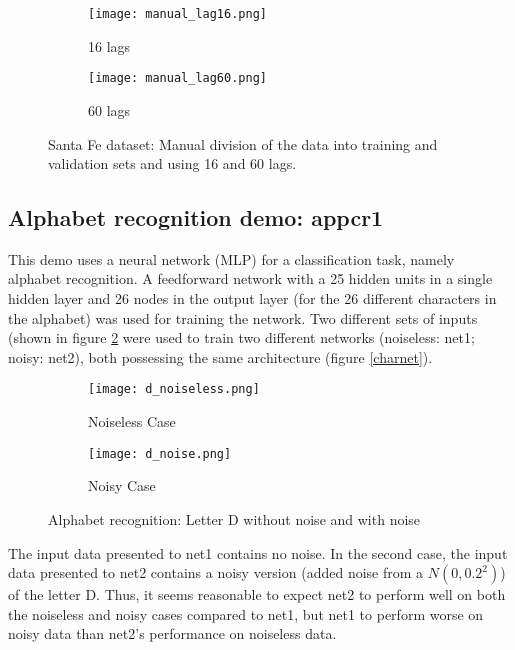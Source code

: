 \documentclass[paper=a4, fontsize=11pt]{scrartcl} %
\numberwithin{equation}{section} %
\begin{document}
\begin{figure}[ht]
	\begin{subfigure}[b]{0.5\textwidth}
	\centering
	\texttt{[image: manual\_lag16.png]}
	\caption{16 lags}
	\end{subfigure}
	\begin{subfigure}[b]{0.5\textwidth}
	\centering
	\texttt{[image: manual\_lag60.png]}
	\caption{60 lags}
	\end{subfigure}
\caption{Santa Fe dataset: Manual division of the data into training and validation sets and using 16 and 60 lags.}
\label{manual}
\end{figure}

\subsection{Alphabet recognition demo: appcr1}

This demo uses a neural network (MLP) for a classification task, namely alphabet recognition. A feedforward network with a 25 hidden units in a single hidden layer and 26 nodes in the output layer (for the 26 different characters in the alphabet) was used for training the network. Two different sets of inputs (shown in figure \ref{char} were used to train two different networks (noiseless: net1; noisy: net2), both possessing the same architecture (figure \ref{charnet}). \\

\begin{figure}[ht]
\begin{subfigure}{0.5\textwidth}
		\centering
		\texttt{[image: d\_noiseless.png]}
		\caption{Noiseless Case}
	\end{subfigure}
	\begin{subfigure}{0.5\textwidth}
		\centering
		\texttt{[image: d\_noise.png]}
		\caption{Noisy Case}
	\end{subfigure}
\caption{Alphabet recognition: Letter D without noise and with noise}
\label{char}
\end{figure}

The input data presented to net1 contains no noise. In the second case, the input data presented to net2 contains a noisy version (added noise from a $N(0,0.2^2)$) of the letter D. Thus, it seems reasonable to expect net2 to perform well on both the noiseless and noisy cases compared to net1, but net1 to perform worse on noisy data than net2's performance on noiseless data.\\
\end{document}
